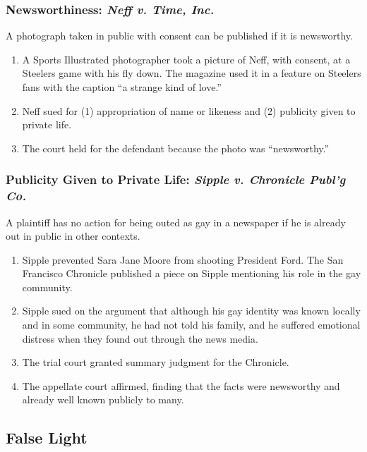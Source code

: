 \subsubsection{Newsworthiness: \emph{Neff v. Time, Inc.}}

A photograph taken in public with consent can be published if it is 
newsworthy.

\begin{enumerate}
    \item A Sports Illustrated photographer took a picture of Neff, with 
    consent, at a Steelers game with his fly down. The magazine used it in a 
    feature on Steelers fans with the caption ``a strange kind of love.''
    \item Neff sued for (1) appropriation of name or likeness and (2) 
    publicity given to private life. 
    \item The court held for the defendant because the photo was 
    ``newsworthy.''
\end{enumerate}

\subsubsection{Publicity Given to Private Life: \emph{Sipple v. Chronicle Publ'g Co.}}

A plaintiff has no action for being outed as gay in a newspaper if he is 
already out in public in other contexts.

\begin{enumerate}
    \item Sipple prevented Sara Jane Moore from shooting President Ford. The 
    San Francisco Chronicle published a piece on Sipple mentioning his role in 
    the gay community.
    \item Sipple sued on the argument that although his gay identity was known 
    locally and in some community, he had not told his family, and he suffered 
    emotional distress when they found out through the news media.
    \item The trial court granted summary judgment for the Chronicle.
    \item The appellate court affirmed, finding that the facts were newsworthy 
    and already well known publicly to many.
\end{enumerate}

\subsection{False Light}

